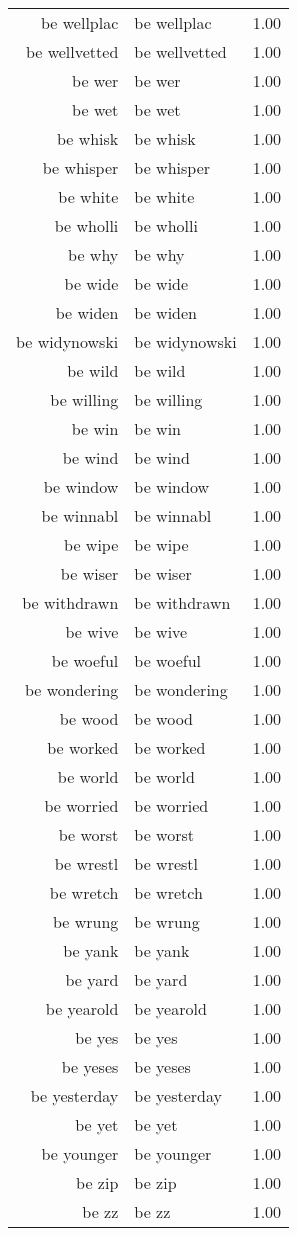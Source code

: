 \begin{table}[ht]
\begin{tabular}{rlr}
  be wellplac & be wellplac & 1.00 \\ 
  be wellvetted & be wellvetted & 1.00 \\ 
  be wer & be wer & 1.00 \\ 
  be wet & be wet & 1.00 \\ 
  be whisk & be whisk & 1.00 \\ 
  be whisper & be whisper & 1.00 \\ 
  be white & be white & 1.00 \\ 
  be wholli & be wholli & 1.00 \\ 
  be why & be why & 1.00 \\ 
  be wide & be wide & 1.00 \\ 
  be widen & be widen & 1.00 \\ 
  be widynowski & be widynowski & 1.00 \\ 
  be wild & be wild & 1.00 \\ 
  be willing & be willing & 1.00 \\ 
  be win & be win & 1.00 \\ 
  be wind & be wind & 1.00 \\ 
  be window & be window & 1.00 \\ 
  be winnabl & be winnabl & 1.00 \\ 
  be wipe & be wipe & 1.00 \\ 
  be wiser & be wiser & 1.00 \\ 
  be withdrawn & be withdrawn & 1.00 \\ 
  be wive & be wive & 1.00 \\ 
  be woeful & be woeful & 1.00 \\ 
  be wondering & be wondering & 1.00 \\ 
  be wood & be wood & 1.00 \\ 
  be worked & be worked & 1.00 \\ 
  be world & be world & 1.00 \\ 
  be worried & be worried & 1.00 \\ 
  be worst & be worst & 1.00 \\ 
  be wrestl & be wrestl & 1.00 \\ 
  be wretch & be wretch & 1.00 \\ 
  be wrung & be wrung & 1.00 \\ 
  be yank & be yank & 1.00 \\ 
  be yard & be yard & 1.00 \\ 
  be yearold & be yearold & 1.00 \\ 
  be yes & be yes & 1.00 \\ 
  be yeses & be yeses & 1.00 \\ 
  be yesterday & be yesterday & 1.00 \\ 
  be yet & be yet & 1.00 \\ 
  be younger & be younger & 1.00 \\ 
  be zip & be zip & 1.00 \\ 
  be zz & be zz & 1.00 \\ 
   \hline
\end{tabular}
\end{table}
